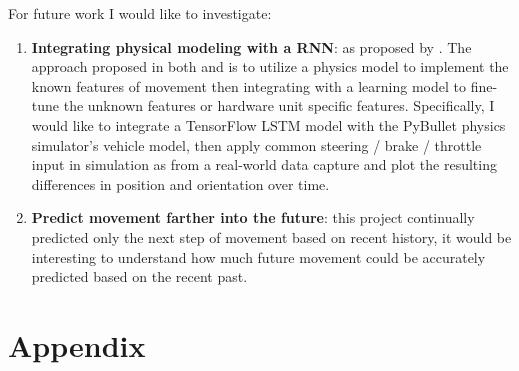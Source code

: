 \documentclass{article}
\begin{document}
For future work I would like to investigate:
\begin{enumerate}
    \item \textbf{Integrating physical modeling with a RNN}: as proposed by \cite{shi2018neural, zeng2019tossingbot}. The approach proposed in both \cite{shi2018neural} and \cite{zeng2019tossingbot} is to utilize a physics model to implement the known features of movement then integrating with a learning model to fine-tune the unknown features or hardware unit specific features. Specifically, I would like to integrate a TensorFlow LSTM model with the PyBullet \cite{bullet} physics simulator's vehicle model, then apply common steering / brake / throttle input in simulation as from a real-world data capture and plot the resulting differences in position and orientation over time.
    \item \textbf{Predict movement farther into the future}: this project continually predicted only the next step of movement based on recent history, it would be interesting to understand how much future movement could be accurately predicted based on the recent past.
\end{enumerate}

\printbibliography

\section{Appendix}
\end{document}
